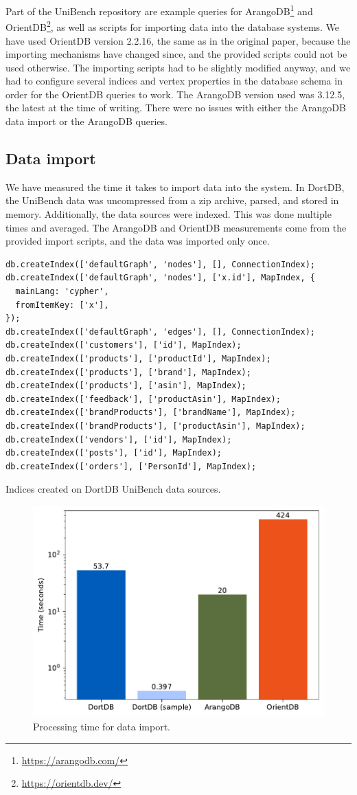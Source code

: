 Part of the UniBench repository are example queries for ArangoDB\footnote{\url{https://arangodb.com/}} and OrientDB\footnote{\url{https://orientdb.dev/}}, as well as scripts for importing data into the database systems. We have used OrientDB version 2.2.16, the same as in the original paper, because the importing mechanisms have changed since, and the provided scripts could not be used otherwise. The importing scripts had to be slightly modified anyway, and we had to configure several indices and vertex properties in the database schema in order for the OrientDB queries to work. The ArangoDB version used was 3.12.5, the latest at the time of writing. There were no issues with either the ArangoDB data import or the ArangoDB queries.

\subsection{Data import}

We have measured the time it takes to import data into the system. In DortDB, the UniBench data was uncompressed from a zip archive, parsed, and stored in memory. Additionally, the data sources were indexed. This was done multiple times and averaged. The ArangoDB and OrientDB measurements come from the provided import scripts, and the data was imported only once.

\begin{listing}[!ht]
\begin{verbatim}
db.createIndex(['defaultGraph', 'nodes'], [], ConnectionIndex);
db.createIndex(['defaultGraph', 'nodes'], ['x.id'], MapIndex, {
  mainLang: 'cypher',
  fromItemKey: ['x'],
});
db.createIndex(['defaultGraph', 'edges'], [], ConnectionIndex);
db.createIndex(['customers'], ['id'], MapIndex);
db.createIndex(['products'], ['productId'], MapIndex);
db.createIndex(['products'], ['brand'], MapIndex);
db.createIndex(['products'], ['asin'], MapIndex);
db.createIndex(['feedback'], ['productAsin'], MapIndex);
db.createIndex(['brandProducts'], ['brandName'], MapIndex);
db.createIndex(['brandProducts'], ['productAsin'], MapIndex);
db.createIndex(['vendors'], ['id'], MapIndex);
db.createIndex(['posts'], ['id'], MapIndex);
db.createIndex(['orders'], ['PersonId'], MapIndex);
\end{verbatim}
\caption{Indices created on DortDB UniBench data sources.}
\end{listing}

\begin{figure}[!ht]
    \centering
    \includegraphics[width=0.6\linewidth]{img/unibench-init.pdf}
    \caption{Processing time for data import.}
    \label{fig:unibench-init}
\end{figure}

